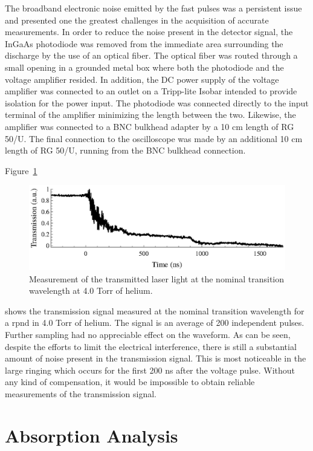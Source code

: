 The broadband electronic noise emitted by the fast pulses was a persistent issue
and presented one the greatest challenges in the acquisition of accurate
measurements. In order to reduce the noise present in the detector signal, the
InGaAs photodiode was removed from the immediate area surrounding the discharge
by the use of an optical fiber. The optical fiber was routed through a small
opening in a grounded metal box where both the photodiode and the voltage
amplifier resided. In addition, the DC power supply of the voltage amplifier was
connected to an outlet on a Tripp-lite Isobar intended to provide isolation for
the power input. The photodiode was connected directly to the input terminal of
the amplifier minimizing the length between the two. Likewise, the amplifier was
connected to a BNC bulkhead adapter by a 10 cm length of RG 50/U. The final
connection to the oscilloscope was made by an additional 10 cm length of RG
50/U, running from the BNC bulkhead connection.

Figure~\ref{fig:transmitted}
\begin{figure}
  \centering
  \includegraphics{./chapters/metastables/figures/transmitted.eps}
  \caption{Measurement of the transmitted laser light at the nominal transition
  wavelength at 4.0 Torr of helium.}
  \label{fig:transmitted}
\end{figure}
shows the transmission signal measured at the nominal transition wavelength for
a \acs{rpnd} in 4.0 Torr of helium. The signal is an average of 200 independent
pulses. Further sampling had no appreciable effect on the waveform. As can be
seen, despite the efforts to limit the electrical interference, there is still a
substantial amount of noise present in the transmission signal. This is most
noticeable in the large ringing which occurs for the first 200 ns after the
voltage pulse. Without any kind of compensation, it would be impossible to
obtain reliable measurements of the transmission signal.

\section{Absorption Analysis}

